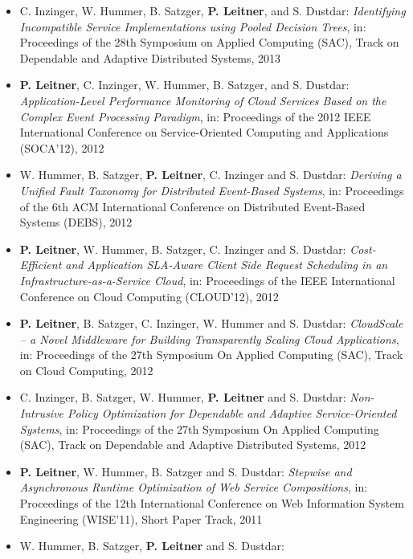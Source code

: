 \documentclass[paper=letter,fontsize=11pt]{scrartcl} %
\begin{document}
\begin{itemize}
\emph{Position Paper: Model-based Adaptation of Cloud Computing Applications},  in: Proceedings of the International Conference on Model-Driven Engineering and Software Development (MODELSWARD), Special Track on Model-driven Software Adaptation (MODA), 2013
\item C. Inzinger, W. Hummer, B. Satzger, \textbf{P. Leitner}, and S. Dustdar:
\emph{Identifying Incompatible Service Implementations using Pooled Decision Trees},  in: Proceedings of the 28th Symposium on Applied Computing (SAC), Track on Dependable and Adaptive Distributed Systems, 2013
\item \textbf{P. Leitner}, C. Inzinger, W. Hummer, B. Satzger, and S. Dustdar:
\emph{Application-Level Performance Monitoring of Cloud Services Based on the Complex Event Processing Paradigm}, in: Proceedings of the 2012 IEEE International Conference on Service-Oriented Computing and Applications (SOCA'12), 2012
\item W. Hummer, B. Satzger, \textbf{P. Leitner}, C. Inzinger and S. Dustdar:
\emph{Deriving a Unified Fault Taxonomy for Distributed Event-Based Systems}, in: Proceedings of the 6th ACM International Conference on Distributed Event-Based Systems (DEBS), 2012
\item \textbf{P. Leitner}, W. Hummer, B. Satzger, C. Inzinger and S. Dustdar:
\emph{Cost-Efficient and Application SLA-Aware Client Side Request Scheduling in an Infrastructure-as-a-Service Cloud}, in: Proceedings of the IEEE International Conference on Cloud Computing (CLOUD'12), 2012
\item \textbf{P. Leitner}, B. Satzger, C. Inzinger, W. Hummer and S. Dustdar:
\emph{CloudScale -- a Novel Middleware for Building Transparently Scaling
Cloud Applications}, in: Proceedings of the 27th Symposium On Applied Computing (SAC),
Track on Cloud Computing, 2012
\item C. Inzinger, B. Satzger, W. Hummer, \textbf{P. Leitner} and S. Dustdar:
\emph{Non-Intrusive Policy Optimization for Dependable and Adaptive Service-Oriented Systems}, in: Proceedings of the 27th Symposium On Applied Computing (SAC),
Track on Dependable and Adaptive Distributed Systems, 2012
\item \textbf{P. Leitner}, W. Hummer, B. Satzger and S. Dustdar:
\emph{Stepwise and Asynchronous Runtime Optimization of Web Service
Compositions}, in: Proceedings of the 12th International Conference on Web
Information System Engineering (WISE'11), Short Paper Track, 2011
\item W. Hummer, B. Satzger, \textbf{P. Leitner} and S. Dustdar:

\end{itemize}
\end{document}
